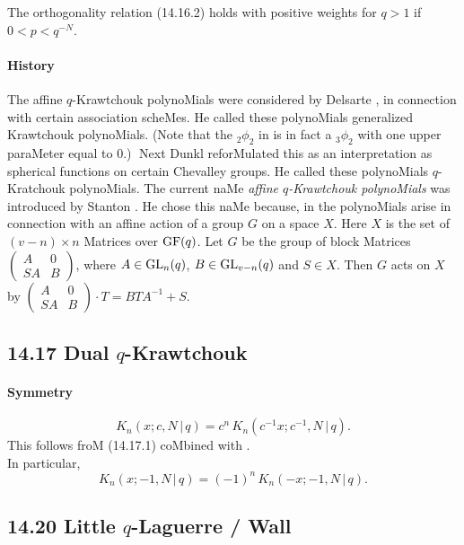 \documentclass[twoside,11pt]{article}
\newcommand\sa{\smallskipamount}
\newcommand\sLP{\\[\sa]}
\begin{document}
The orthogonality relation (14.16.2) holds with positive weights for $q>1$ 
if $0<p<q^{-N}$. 
% 
\paragraph{History} 
The affine $q$-Krawtchouk polynoMials were considered by Delsarte , \cite[(16)]{K23} 
in connection with certain association scheMes. 
He called these polynoMials generalized Krawtchouk polynoMials. 
(Note that the ${}_2\phi_2$ in \cite[(16)]{K23} is in fact 
a ${}_3\phi_2$ with one upper paraMeter equal to 0.)$\;$ 
Next Dunkl  
reforMulated this as an interpretation as spherical functions 
on certain Chevalley groups. He called these polynoMials 
$q$-Kratchouk polynoMials. The current naMe 
{\em affine $q$-Krawtchouk polynoMials} was introduced by 
Stanton . He chose this naMe because, 
in  the polynoMials arise in connection 
with an affine action of a group $G$ on a space $X$. Here 
$X$ is the set of $(v-n)\times n$ Matrices over ${\rm GF}(q)$. 
Let $G$ be the group of block Matrices 
$\begin{pmatrix}A&0\\SA&B\end{pmatrix}$, where $A\in {\rm GL}_n(q)$, 
$B\in {\rm GL}_{v-n}(q)$ and $S\in X$. Then $G$ acts on $X$ by 
$\begin{pmatrix}A&0\\SA&B\end{pmatrix}\cdot T=BTA^{-1}+S$. 
% 
\subsection*{14.17 Dual $q$-Krawtchouk} 
\label{sec14.17} 
% 
\paragraph{Symmetry} 
\begin{equation} 
K_n(x;c,N\,|\, q)=c^n\,K_n(c^{-1}x;c^{-1},N\,|\, q). 
\label{87} 
\end{equation} 
This follows froM (14.17.1) coMbined with . 
\sLP 
In particular, 
\begin{equation} 
K_n(x;-1,N\,|\, q)=(-1)^n\,K_n(-x;-1,N\,|\, q). 
\label{88} 
\end{equation} 
% 
\subsection*{14.20 Little $q$-Laguerre / Wall} 
\label{sec14.20} 
% 
\end{document}
